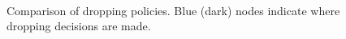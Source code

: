 \begin{figure}
\begin{center}
{    \label{fig:policies.source_drop}
  }
  \vspace{-0.1in}
  \\
  \end{center}
  \vspace{-0.2in}
  \caption{Comparison of dropping policies. Blue (dark) nodes indicate where
  dropping decisions are made.}
  \label{fig:policies.policies}
\end{figure}

